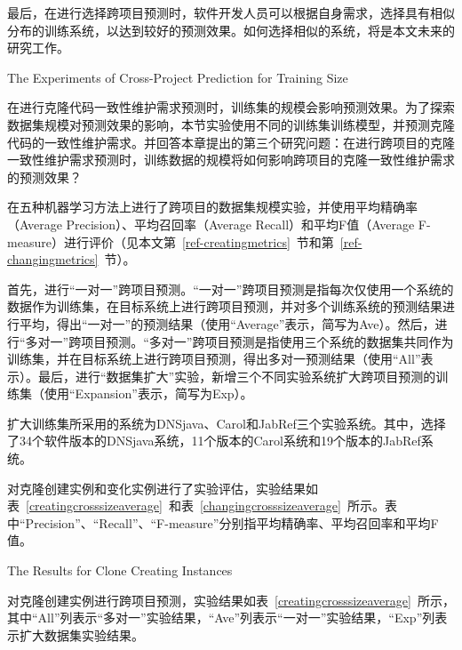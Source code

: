 最后，在进行选择跨项目预测时，软件开发人员可以根据自身需求，选择具有相似分布的训练系统，以达到较好的预测效果。如何选择相似的系统，将是本文未来的研究工作。


{The Experiments of Cross-Project Prediction for Training Size}

在进行克隆代码一致性维护需求预测时，训练集的规模会影响预测效果。为了探索数据集规模对预测效果的影响，本节实验使用不同的训练集训练模型，并预测克隆代码的一致性维护需求。并回答本章提出的第三个研究问题：在进行跨项目的克隆一致性维护需求预测时，训练数据的规模将如何影响跨项目的克隆一致性维护需求的预测效果？

在五种机器学习方法上进行了跨项目的数据集规模实验，并使用平均精确率（Average Precision）、平均召回率（Average Recall）和平均F值（Average F-measure）进行评价（见本文第~\ref{ref-creatingmetrics}~节和第~\ref{ref-changingmetrics}~节）。

首先，进行“一对一”跨项目预测。“一对一”跨项目预测是指每次仅使用一个系统的数据作为训练集，在目标系统上进行跨项目预测，并对多个训练系统的预测结果进行平均，得出“一对一”的预测结果（使用“Average”表示，简写为Ave）。然后，进行“多对一”跨项目预测。“多对一”跨项目预测是指使用三个系统的数据集共同作为训练集，并在目标系统上进行跨项目预测，得出多对一预测结果（使用“All”表示）。最后，进行“数据集扩大”实验，新增三个不同实验系统扩大跨项目预测的训练集（使用“Expansion”表示，简写为Exp）。

扩大训练集所采用的系统为DNSjava、Carol和JabRef三个实验系统。其中，选择了34个软件版本的DNSjava系统，11个版本的Carol系统和19个版本的JabRef系统。

对克隆创建实例和变化实例进行了实验评估，实验结果如表~\ref{creatingcrosssizeaverage}~和表~\ref{changingcrosssizeaverage}~所示。表中“Precision”、“Recall”、“F-measure”分别指平均精确率、平均召回率和平均F值。



{The Results for Clone Creating Instances}

对克隆创建实例进行跨项目预测，实验结果如表~\ref{creatingcrosssizeaverage}~所示，其中“All”列表示“多对一”实验结果，“Ave”列表示“一对一”实验结果，“Exp”列表示扩大数据集实验结果。

